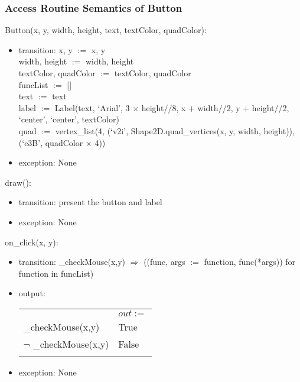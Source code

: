 \documentclass{article}
\begin{document}
\subsubsection {Access Routine Semantics of Button}
\noindent Button(x, y, width, height, text, textColor, quadColor):
\begin{itemize}
\item transition: x, y $:=$ x, y\\
    width, height $:=$ width, height\\
    textColor, quadColor $:=$ textColor, quadColor\\
    funcList $:=$ []\\
    text $:=$ text\\
    label $:=$ Label(text, `Arial', 3 $\times$ height//8, x + width//2, y + height//2, `center', `center', textColor)\\
    quad $:=$ vertex\_list(4, (`v2i', Shape2D.quad\_vertices(x, y, width, height)), (`c3B', quadColor $\times$ 4))
\item exception: None
\end{itemize}\vspace{6mm}

\noindent draw():
\begin{itemize}
\item transition: present the button and label
\item exception: None
\end{itemize}\vspace{6mm}

\noindent on\_click(x, y):
\begin{itemize}
\item transition: \_checkMouse(x,y) $\Rightarrow$ ((func, args $:=$ function, func(*args)) for function in funcList)
\item output: 

\begin{tabular}{|l|l|}
\hhline{~|-|}
\multicolumn{1}{r|}{} & \multicolumn{1}{l|}{$out :=$}\\
\hhline{|-|-|}
\_checkMouse(x,y) & True \\
\hhline{|-|-|}
$\neg$ \_checkMouse(x,y) & False \\
\hhline{|-|-|}
\end{tabular}

\item exception: None
\end{itemize}\vspace{6mm}
\end{document}
